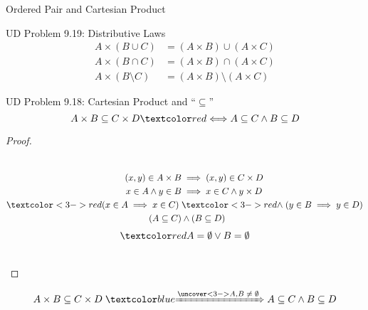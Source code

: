 \begin{frame}{}
  \centerline{\LARGE Ordered Pair and Cartesian Product}


\end{frame}

\begin{frame}{}
  \begin{exampleblock}{UD Problem 9.19: Distributive Laws}
    \begin{align*}
      A \times (B \cup C) &= (A \times B) \cup (A \times C) \\
      A \times (B \cap C) &= (A \times B) \cap (A \times C) \\
      A \times (B \setminus C) &= (A \times B) \setminus (A \times C)
    \end{align*}
  \end{exampleblock}

  \pause
\end{frame}

\begin{frame}{}
  \begin{exampleblock}{UD Problem 9.18: Cartesian Product and ``$\subseteq$''}
    \[
      A \times B \subseteq C \times D \red{\iff} A \subseteq C \land B \subseteq D
    \]
  \end{exampleblock}

  \pause
  \begin{proof}
    \begin{columns}
	\begin{align*}
	  (x,y) \in A \times B &\implies (x,y) \in C \times D  \\
	  x \in A \land y \in B &\implies x \in C \land y \times D \\
	  \redoverlay{(x \in A \implies x \in C)}{3-}\; &\redoverlay{\land\; (y \in B \implies y \in D)}{3-} \\
	  (A \subseteq C) &\land (B \subseteq D)
	\end{align*}
	\pause
	\[
	  \red{A = \emptyset \lor B = \emptyset}
	\]
    \end{columns}
  \end{proof}

  \pause
  \[
    A \times B \subseteq C \times D \;\blue{\xRightarrow{\uncover<3->{A, B \;\neq\; \emptyset}}}\; A \subseteq C \land B \subseteq D
  \]

\end{frame}
